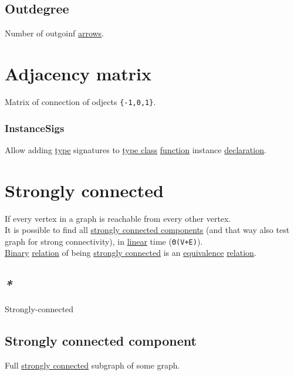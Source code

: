 \documentclass[a4paper,14pt,oneside]{book}
\begin{document}
{\subsection{\label{org0e43333}Outdegree}
\label{sec:orgb7d67fa}
Number of outgoinf \hyperref[org3a8dbdc]{arrows}.\\

\section{\label{org0235053}Adjacency matrix}
\label{sec:org028579d}
Matrix of connection of odjects \texttt{\{-1,0,1\}}.\\

\subsubsection{\label{org1ca717a}InstanceSigs}
\label{sec:orgd3364b1}
Allow adding \hyperref[orga9ca243]{type} signatures to \hyperref[org6c8048d]{type class} \hyperref[org6a60524]{function} instance \hyperref[org07f2519]{declaration}.\\


\section{\label{orgb705c55}Strongly connected}
\label{sec:org9b70ef1}
If every vertex in a graph is reachable from every other vertex.\\

It is possible to find all \hyperref[org6450785]{strongly connected components} (and that way also test graph for strong connectivity), in \hyperref[org059a25a]{linear} time (\texttt{Θ(V+E)}).\\

\hyperref[orge428263]{Binary} \hyperref[orgc61e9ed]{relation} of being \hyperref[orgb705c55]{strongly connected} is an \hyperref[orgea1116b]{equivalence} \hyperref[orgc61e9ed]{relation}.\\

\subsection{\emph{*}}
\label{sec:org7f33d59}

\label{org0502b76}Strongly-connected\\

\subsection{\label{org855b001}Strongly connected component}
\label{sec:org5c60b39}
Full \hyperref[orgb705c55]{strongly connected} subgraph of some graph.\\

}
\end{document}
